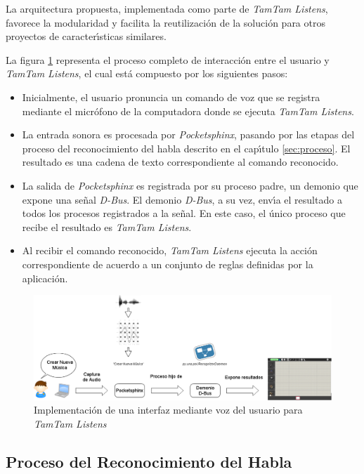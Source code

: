 La arquitectura propuesta, implementada como parte de \emph{TamTam Listens}, favorece la modularidad
y facilita la reutilizaci\'on de la soluci\'on para otros proyectos de caracter{\'\i}sticas similares.

La figura \ref{figure:tamtam-listens-proceso} representa el proceso completo de interacci\'on entre el
usuario y \emph{TamTam Listens}, el cual est\'a compuesto por los siguientes pasos:

\begin{itemize}
  \item Inicialmente, el usuario pronuncia un comando de voz que se registra mediante el micr\'ofono de
  la computadora donde se ejecuta \emph{TamTam Listens}.
  \item La entrada sonora es procesada por \emph{Pocketsphinx}, pasando por las etapas del proceso del
  reconocimiento del habla descrito en el cap{\'\i}tulo \ref{sec:proceso}. El resultado es una cadena de
  texto correspondiente al comando reconocido.
  \item La salida de \emph{Pocketsphinx} es registrada por su proceso padre, un demonio que expone
  una se\~nal \emph{D-Bus}.
  El demonio \emph{D-Bus}, a su vez, env{\'\i}a el resultado a todos los procesos registrados 
  a la se\~nal.
  En este caso, el \'unico proceso que recibe el resultado es \emph{TamTam Listens}.
  \item Al recibir el comando reconocido, \emph{TamTam Listens} ejecuta la acci\'on correspondiente de
  acuerdo a un conjunto de reglas definidas por la aplicaci\'on.
\end{itemize}

\begin{figure}[H] 
\centering
\includegraphics[width=1.0\textwidth]{./graphics/tamtam-proceso.png}
\caption{Implementación de una interfaz mediante voz del usuario para \emph{TamTam Listens}}
\label{figure:tamtam-listens-proceso}
\end{figure}

\subsection{Proceso del Reconocimiento del Habla}
\label{sec:proceso-solucion}

